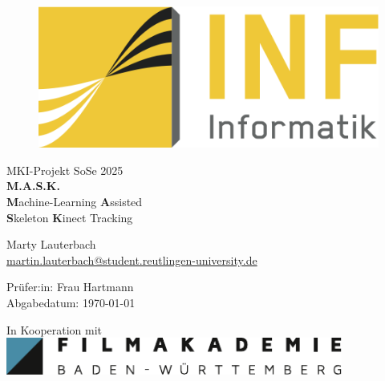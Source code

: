 \begin{titlepage}
	\begin{figure}
		\begin{flushright}
			\includegraphics[scale=0.75]{images/INFLogo.png}
		\end{flushright}
	\end{figure}

	{\centering
		
		\vspace{3.5cm}
		{\Large  MKI-Projekt SoSe 2025}\\
		\vspace{1cm}
		{\LARGE{\textbf{M.A.S.K.}} \\
        \vspace{0.5cm}
        \textbf{\color{Goldenrod}M}achine-Learning \textbf{\color{Goldenrod}A}ssisted \\
        \textbf{\color{Goldenrod}S}keleton \textbf{\color{Goldenrod}K}inect Tracking \\
        }
        
		\vspace{5cm}
		Marty Lauterbach\\
		\url{martin.lauterbach@student.reutlingen-university.de}\\
        \vspace{0.2cm}
        
		Prüfer:in: Frau Hartmann\\
		
		\vspace{0.2cm}
		{\small Abgabedatum: \today}\\

        \vspace{2.5cm}
        \begin{center}
        In Kooperation mit\\
        \vspace{0.3cm}
        \includegraphics[height=1.2cm]{images/FAWB.pdf}
        \end{center}
	}
	

\end{titlepage}
